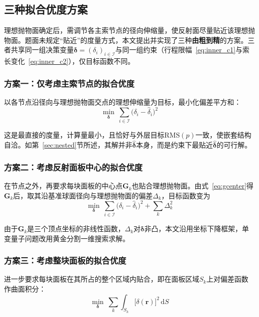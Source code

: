 \documentclass[withoutpreface]{cumcmthesis}
\begin{document}
\subsection{三种拟合优度方案}

理想抛物面确定后，需调节各主索节点的径向伸缩量，使反射面尽量贴近该理想抛物面。题面未规定``贴近''的度量方式，本文提出并实现了三种\textbf{由粗到精}的方案。三者共享同一组决策变量$\boldsymbol{\delta}=(\delta_i)_{i\in\mathcal{I}}$与同一组约束（行程限幅~\eqref{eq:inner_c1}与索长变化~\eqref{eq:inner_c2}），仅目标函数不同。

\subsubsection{方案一：仅考虑主索节点的拟合优度}

以各节点沿径向与理想抛物面交点的理想伸缩量为目标，最小化偏差平方和：
\begin{equation}\label{eq:scheme1}
\min_{\boldsymbol{\delta}}\ \sum_{i\in\mathcal{I}}\bigl(\delta_i-\hat{\delta}_i\bigr)^{2}
\end{equation}

这是最直接的度量，计算量最小，且恰好与外层目标$\mathrm{RMS}(p)$一致，使嵌套结构自洽。如第~\ref{sec:nested}节所述，其解并非$\hat{\boldsymbol{\delta}}$本身，而是约束下最贴近$\hat{\boldsymbol{\delta}}$的可行解。

\subsubsection{方案二：考虑反射面板中心的拟合优度}

在节点之外，再要求每块面板的中心点$\mathbf{G}_k$也贴合理想抛物面。由式~\eqref{eq:gcenter}得$\mathbf{G}_k$后，取其沿基准球面径向与理想抛物面的偏差$\Delta_k$，目标函数变为
\begin{equation}\label{eq:scheme2}
\min_{\boldsymbol{\delta}}\ \sum_{i\in\mathcal{I}}\bigl(\delta_i-\hat{\delta}_i\bigr)^{2}+\sum_{k}\Delta_k^{2}
\end{equation}

由于$\mathbf{G}_k$是三个顶点坐标的非线性函数，$\Delta_k$对$\boldsymbol{\delta}$非凸，本文沿用坐标下降框架，单变量子问题改用黄金分割一维搜索求解。

\subsubsection{方案三：考虑整块面板的拟合优度}

进一步要求每块面板在其所占的整个区域内贴合，即在面板区域$S_k$上对偏差函数作曲面积分：
\begin{equation}\label{eq:scheme3}
\min_{\boldsymbol{\delta}}\ \sum_{k}\int_{S_k}\bigl[\delta(\mathbf{r})\bigr]^{2}\,\mathrm{d}S
\end{equation}
\end{document}

